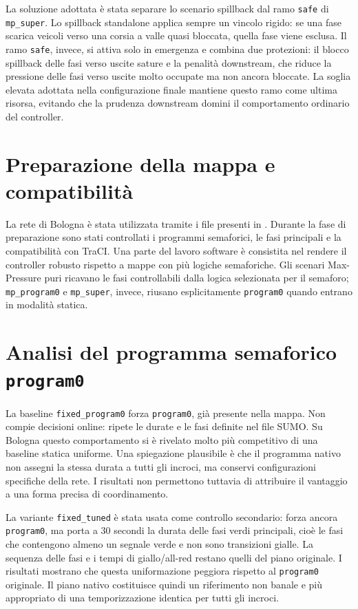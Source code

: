 \documentclass[12pt,a4paper,oneside]{report}
\numberwithin{equation}{chapter}
\begin{document}
La soluzione adottata è stata separare lo scenario spillback dal ramo
\texttt{safe} di \texttt{mp\_super}. Lo spillback standalone applica sempre un
vincolo rigido: se una fase scarica veicoli verso una corsia a valle quasi
bloccata, quella fase viene esclusa. Il ramo \texttt{safe}, invece, si attiva
solo in emergenza e combina due protezioni: il blocco spillback delle fasi verso
uscite sature e la penalità downstream, che riduce la pressione delle fasi verso
uscite molto occupate ma non ancora bloccate. La soglia elevata adottata nella
configurazione finale mantiene questo ramo come ultima risorsa, evitando che la
prudenza downstream domini il comportamento ordinario del controller.

\section{Preparazione della mappa e compatibilità}

La rete di Bologna è stata utilizzata tramite i file presenti in
. Durante la fase di preparazione sono stati
controllati i programmi semaforici, le fasi principali e la compatibilità con
TraCI. Una parte del lavoro software è consistita nel rendere il controller
robusto rispetto a mappe con più logiche semaforiche. Gli scenari Max-Pressure
puri ricavano le fasi controllabili dalla logica selezionata per il semaforo;
\texttt{mp\_program0} e \texttt{mp\_super}, invece, riusano esplicitamente
\texttt{program0} quando entrano in modalità statica.

\section{Analisi del programma semaforico \texttt{program0}}

La baseline \texttt{fixed\_program0} forza \texttt{program0}, già
presente nella mappa. Non compie decisioni online: ripete le durate e le fasi
definite nel file SUMO. Su Bologna questo comportamento si è rivelato molto più
competitivo di una baseline statica uniforme. Una spiegazione plausibile è che
il programma nativo non assegni la stessa durata a tutti gli incroci, ma
conservi configurazioni specifiche della rete. I risultati non permettono
tuttavia di attribuire il vantaggio a una forma precisa di coordinamento.

La variante \texttt{fixed\_tuned} è stata usata come controllo secondario:
forza ancora \texttt{program0}, ma porta a 30 secondi la durata delle fasi verdi
principali, cioè le fasi che contengono almeno un segnale verde e non sono
transizioni gialle. La sequenza delle fasi e i tempi di giallo/all-red restano
quelli del piano originale. I risultati mostrano che questa uniformazione
peggiora rispetto al \texttt{program0} originale. Il piano nativo costituisce
quindi un riferimento non banale e più appropriato di una temporizzazione
identica per tutti gli incroci.
\end{document}
